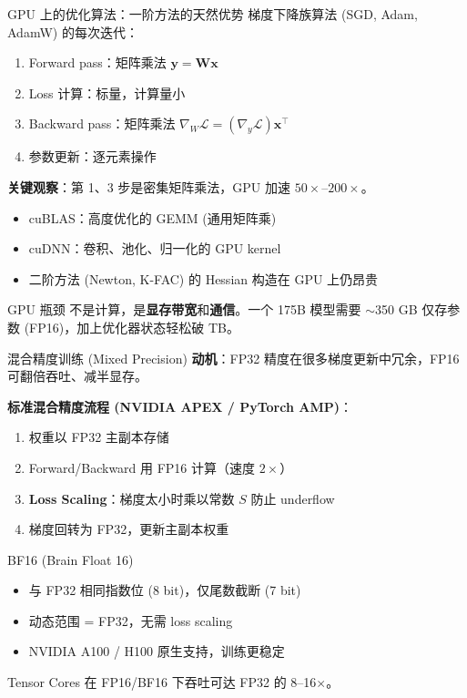 \documentclass[11pt, aspectratio=169, svgnames, table, fontset=fandol]{ctexbeamer}
\begin{document}
\begin{frame}{GPU 上的优化算法：一阶方法的天然优势}
  梯度下降族算法 (SGD, Adam, AdamW) 的每次迭代：
  \begin{enumerate}
    \item Forward pass：矩阵乘法 $\bm{y} = \bm{Wx}$
    \item Loss 计算：标量，计算量小
    \item Backward pass：矩阵乘法 $\nabla_W \mathcal{L} = (\nabla_y \mathcal{L}) \bm{x}^\top$
    \item 参数更新：逐元素操作
  \end{enumerate}

  \vspace{6pt}
  \textbf{关键观察}：第 1、3 步是密集矩阵乘法，GPU 加速 $50\times$--$200\times$。

  \begin{itemize}
    \item cuBLAS：高度优化的 GEMM (通用矩阵乘)
    \item cuDNN：卷积、池化、归一化的 GPU kernel
    \item 二阶方法 (Newton, K-FAC) 的 Hessian 构造在 GPU 上仍昂贵
  \end{itemize}

  \begin{alertblock}{GPU 瓶颈}
    不是计算，是\textbf{显存带宽}和\textbf{通信}。一个 175B 模型需要 $\sim$350 GB 仅存参数 (FP16)，加上优化器状态轻松破 TB。
  \end{alertblock}
\end{frame}

\begin{frame}{混合精度训练 (Mixed Precision)}
  \textbf{动机}：FP32 精度在很多梯度更新中冗余，FP16 可翻倍吞吐、减半显存。

  \vspace{4pt}
  \textbf{标准混合精度流程 (NVIDIA APEX / PyTorch AMP)}：
  \begin{enumerate}
    \item 权重以 FP32 主副本存储
    \item Forward/Backward 用 FP16 计算（速度 $2\times$）
    \item \textbf{Loss Scaling}：梯度太小时乘以常数 $S$ 防止 underflow
    \item 梯度回转为 FP32，更新主副本权重
  \end{enumerate}

  \begin{block}{BF16 (Brain Float 16)}
    \begin{itemize}
      \item 与 FP32 相同指数位 (8 bit)，仅尾数截断 (7 bit)
      \item 动态范围 = FP32，无需 loss scaling
      \item NVIDIA A100 / H100 原生支持，训练更稳定
    \end{itemize}
  \end{block}

  Tensor Cores 在 FP16/BF16 下吞吐可达 FP32 的 8--16$\times$。
\end{frame}
\end{document}
